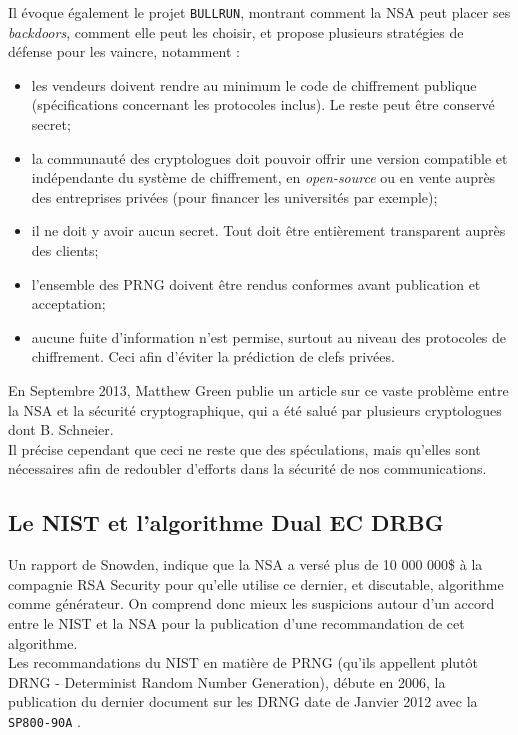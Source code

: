 	Il évoque également le projet \texttt{BULLRUN}, montrant comment la NSA peut placer ses \textit{backdoors}, comment elle peut les choisir, et propose plusieurs stratégies de défense \cite{schneier2013NSA} pour les vaincre, notamment : 
	\begin{itemize}
	\item les vendeurs doivent rendre au minimum le code de chiffrement publique (spécifications concernant les protocoles inclus). Le reste peut être conservé secret;
	\item la communauté des cryptologues doit pouvoir offrir une version compatible et indépendante du système de chiffrement, en \textit{open-source} ou en vente auprès des entreprises privées (pour financer les universités par exemple);
	\item il ne doit y avoir aucun secret. Tout doit être entièrement transparent auprès des clients; 
	\item l'ensemble des PRNG doivent être rendus conformes avant publication et acceptation;
	\item aucune fuite d'information n'est permise, surtout au niveau des protocoles de chiffrement. Ceci afin d'éviter la prédiction de clefs privées.\\
	\end{itemize}
	
	En Septembre 2013, Matthew Green publie un article \cite{green2013NSA} sur ce vaste problème entre la NSA et la sécurité cryptographique, qui a été salué par plusieurs cryptologues dont B. Schneier.\\
	
	Il précise cependant que ceci ne reste que des spéculations, mais qu'elles sont nécessaires afin de redoubler d'efforts dans la sécurité de nos communications.\\


	\subsection{Le NIST et l'algorithme Dual EC DRBG}
	
	Un rapport de Snowden, indique que la NSA a versé plus de 10 000 000\$ à la compagnie RSA Security \cite{ravi2013NSA} pour qu'elle utilise ce dernier, et discutable, algorithme comme générateur. On comprend donc mieux les suspicions autour d'un accord entre le NIST et la NSA pour la publication d'une recommandation de cet algorithme.\\	
	
	Les recommandations du NIST en matière de PRNG (qu'ils appellent plutôt DRNG - Determinist Random Number Generation), débute en 2006, la publication du dernier document sur les DRNG date de Janvier 2012 avec la \texttt{SP800-90A} \cite{nist800-90A}.\\

